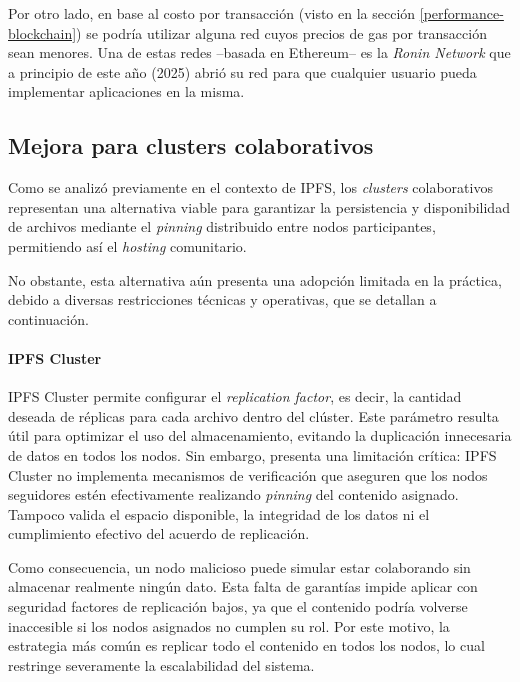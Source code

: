 Por otro lado, en base al costo por transacción (visto en la sección \ref{performance-blockchain}) se podría utilizar alguna red cuyos precios de gas por transacción sean menores. Una de estas redes --basada en Ethereum-- es la \textit{Ronin Network} \cite{ronin-network} \cite{ronin-network-whitepaper} que a principio de este año (2025) abrió su red para que cualquier usuario pueda implementar aplicaciones en la misma.

\subsection{Mejora para clusters colaborativos}

Como se analizó previamente en el contexto de IPFS, los \textit{clusters} colaborativos representan una alternativa viable para garantizar la persistencia y disponibilidad de archivos mediante el \textit{pinning} distribuido entre nodos participantes, permitiendo así el \textit{hosting} comunitario.

No obstante, esta alternativa aún presenta una adopción limitada en la práctica, debido a diversas restricciones técnicas y operativas, que se detallan a continuación.

\paragraph{IPFS Cluster}

IPFS Cluster permite configurar el \textit{replication factor}, es decir, la cantidad deseada de réplicas para cada archivo dentro del clúster. Este parámetro resulta útil para optimizar el uso del almacenamiento, evitando la duplicación innecesaria de datos en todos los nodos. Sin embargo, presenta una limitación crítica: IPFS Cluster no implementa mecanismos de verificación que aseguren que los nodos seguidores estén efectivamente realizando \textit{pinning} del contenido asignado. Tampoco valida el espacio disponible, la integridad de los datos ni el cumplimiento efectivo del acuerdo de replicación.

Como consecuencia, un nodo malicioso puede simular estar colaborando sin almacenar realmente ningún dato. Esta falta de garantías impide aplicar con seguridad factores de replicación bajos, ya que el contenido podría volverse inaccesible si los nodos asignados no cumplen su rol. Por este motivo, la estrategia más común es replicar todo el contenido en todos los nodos, lo cual restringe severamente la escalabilidad del sistema.

